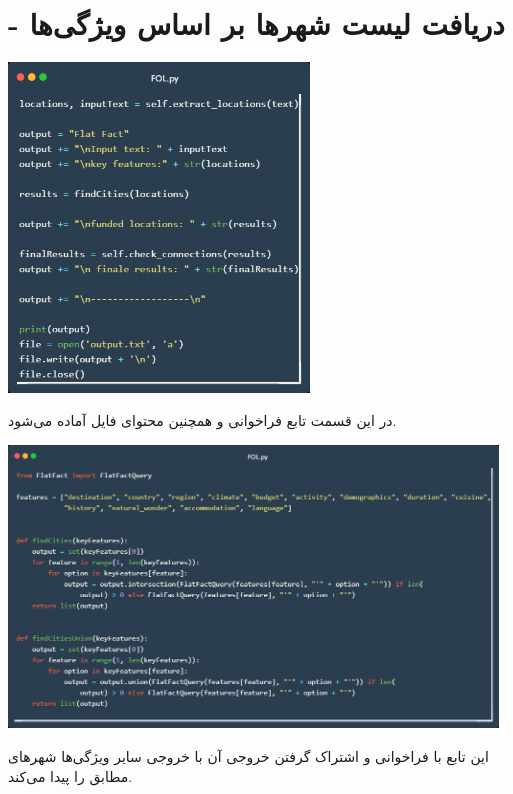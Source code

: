 \documentclass[12pt, dvipsnames, svgnames, x11names,]{article}
\begin{document}
	\section{ - دریافت لیست شهرها بر اساس ویژگی‌ها}
		\begin{center}
			\includegraphics[width=8cm]{images/06}
		\end{center}
		{\normalsize در این قسمت تابع  فراخوانی و همچنین محتوای فایل  آماده می‌شود.} \par
		\begin{center}
			\includegraphics[width=13cm]{images/07}
		\end{center}
		{\normalsize این تابع با فراخوانی  و اشتراک گرفتن خروجی آن با خروجی سایر ویژگی‌ها شهرهای مطابق را پیدا می‌‌کند.}
	
\end{document}
